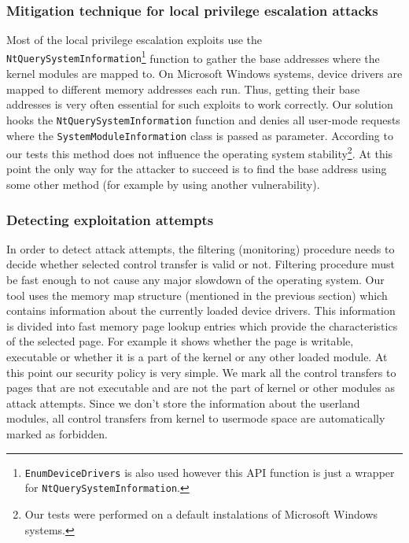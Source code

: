 \documentclass[10pt,twocolumn,a4paper]{article}
\begin{document}
\subsubsection{Mitigation technique for local privilege escalation attacks}\label{local_mitigation}

Most of the local privilege escalation exploits use the {\tt{NtQuerySystemInformation}}\footnote{{\tt{EnumDeviceDrivers}} is also used however this API function is just a wrapper for {\tt{NtQuerySystemInformation}}.}  function to gather the base addresses where the kernel modules are mapped to. On Microsoft Windows systems, device drivers are mapped to different memory addresses each run. Thus, getting their base addresses is very often essential for such exploits to work correctly. Our solution hooks the {\tt{NtQuerySystemInformation}} function and denies all user-mode requests where the {\tt{SystemModuleInformation}} class is passed as parameter. According to our tests this method does not influence the operating system stability\footnote{Our tests were performed on a default instalations of Microsoft Windows systems.}. At this point the only way for the attacker to succeed is to find the base address using some other method (for example by using another vulnerability).

\subsubsection{Detecting exploitation attempts}\label{exploit_detection}

In order to detect attack attempts, the filtering (monitoring) procedure needs to decide whether selected control transfer is valid or not. Filtering procedure must be fast enough to not cause any major slowdown of the operating system. Our tool uses the memory map structure (mentioned in the previous section) which contains information about the currently loaded device drivers. This information is divided into fast memory page lookup entries which provide the characteristics of the selected page. For example it shows whether the page is writable, executable or whether it is a part of the kernel or any other loaded module. At this point our security policy is very simple. We mark all the control transfers to pages that are not executable and are not the part of kernel or other modules as attack attempts. Since we don't store the information about the userland modules, all control transfers from kernel to usermode space are automatically marked as forbidden.
\end{document}
